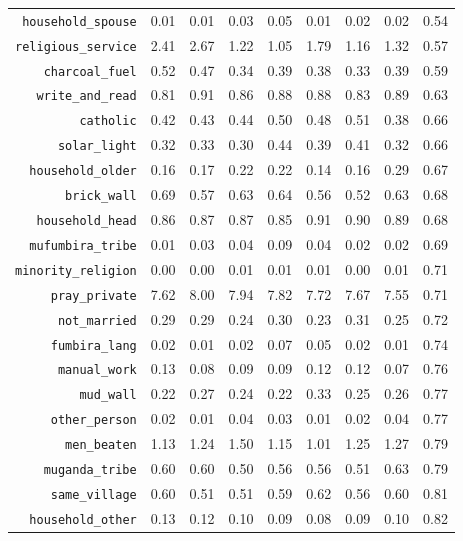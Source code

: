 \begin{longtable}{rrrrrrrrr}
  {\texttt{household\_spouse}} & 0.01 & 0.01 & 0.03 & 0.05 & 0.01 & 0.02 & 0.02 & 0.54 \\ 
  {\texttt{religious\_service}} & 2.41 & 2.67 & 1.22 & 1.05 & 1.79 & 1.16 & 1.32 & 0.57 \\ 
  {\texttt{charcoal\_fuel}} & 0.52 & 0.47 & 0.34 & 0.39 & 0.38 & 0.33 & 0.39 & 0.59 \\ 
  {\texttt{write\_and\_read}} & 0.81 & 0.91 & 0.86 & 0.88 & 0.88 & 0.83 & 0.89 & 0.63 \\ 
  {\texttt{catholic}} & 0.42 & 0.43 & 0.44 & 0.50 & 0.48 & 0.51 & 0.38 & 0.66 \\ 
  {\texttt{solar\_light}} & 0.32 & 0.33 & 0.30 & 0.44 & 0.39 & 0.41 & 0.32 & 0.66 \\ 
  {\texttt{household\_older}} & 0.16 & 0.17 & 0.22 & 0.22 & 0.14 & 0.16 & 0.29 & 0.67 \\ 
  {\texttt{brick\_wall}} & 0.69 & 0.57 & 0.63 & 0.64 & 0.56 & 0.52 & 0.63 & 0.68 \\ 
  {\texttt{household\_head}} & 0.86 & 0.87 & 0.87 & 0.85 & 0.91 & 0.90 & 0.89 & 0.68 \\ 
  {\texttt{mufumbira\_tribe}} & 0.01 & 0.03 & 0.04 & 0.09 & 0.04 & 0.02 & 0.02 & 0.69 \\ 
  {\texttt{minority\_religion}} & 0.00 & 0.00 & 0.01 & 0.01 & 0.01 & 0.00 & 0.01 & 0.71 \\ 
  {\texttt{pray\_private}} & 7.62 & 8.00 & 7.94 & 7.82 & 7.72 & 7.67 & 7.55 & 0.71 \\ 
  {\texttt{not\_married}} & 0.29 & 0.29 & 0.24 & 0.30 & 0.23 & 0.31 & 0.25 & 0.72 \\ 
  {\texttt{fumbira\_lang}} & 0.02 & 0.01 & 0.02 & 0.07 & 0.05 & 0.02 & 0.01 & 0.74 \\ 
  {\texttt{manual\_work}} & 0.13 & 0.08 & 0.09 & 0.09 & 0.12 & 0.12 & 0.07 & 0.76 \\ 
  {\texttt{mud\_wall}} & 0.22 & 0.27 & 0.24 & 0.22 & 0.33 & 0.25 & 0.26 & 0.77 \\ 
  {\texttt{other\_person}} & 0.02 & 0.01 & 0.04 & 0.03 & 0.01 & 0.02 & 0.04 & 0.77 \\ 
  {\texttt{men\_beaten}} & 1.13 & 1.24 & 1.50 & 1.15 & 1.01 & 1.25 & 1.27 & 0.79 \\ 
  {\texttt{muganda\_tribe}} & 0.60 & 0.60 & 0.50 & 0.56 & 0.56 & 0.51 & 0.63 & 0.79 \\ 
  {\texttt{same\_village}} & 0.60 & 0.51 & 0.51 & 0.59 & 0.62 & 0.56 & 0.60 & 0.81 \\ 
  {\texttt{household\_other}} & 0.13 & 0.12 & 0.10 & 0.09 & 0.08 & 0.09 & 0.10 & 0.82 \\ 

\end{longtable}
